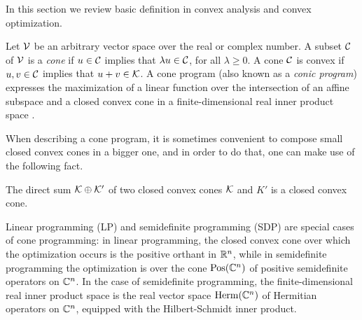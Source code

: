 In this section we review basic definition in convex analysis and convex optimization.

Let $\mathcal{V}$ be an arbitrary vector space over the real or complex number.
A subset $\mathcal{C}$ of $\mathcal{V}$ is a \emph{cone} if $u\in\mathcal{C}$ implies that $\lambda u \in \mathcal{C}$,
for all $\lambda \geq 0$. A cone $\mathcal{C}$ is convex if $u,v\in\mathcal{C}$ implies that
$u + v \in \mathcal{K}$.
A cone program (also known as a \emph{conic program}) expresses the
maximization of a linear function over the intersection of an affine subspace
and a closed convex cone in a finite-dimensional real inner product
space \cite{Boyd04}. 

When describing a cone program, it is sometimes convenient to compose small closed convex 
cones in a bigger one, and in order to do that, one can make use of the following fact. 
\begin{fact}
\label{fact:direct-sum-closed}
The direct sum $\mathcal{K} \oplus \mathcal{K}'$ of two closed convex cones $\mathcal{K}$ and $K'$ is a 
closed convex cone. 
\end{fact}

Linear programming (LP) and semidefinite programming (SDP) are special cases of cone
programming: in linear programming, the closed convex cone over which the
optimization occurs is the positive orthant in $\mathbb{R}^n$, while in semidefinite
programming the optimization is over the cone $\mathrm{Pos}(\mathbb{C}^n)$ of positive
semidefinite operators on $\mathbb{C}^n$.
In the case of semidefinite programming, the finite-dimensional real inner
product space is the real vector space $\mathrm{Herm}(\mathbb{C}^n)$ of Hermitian
operators on $\mathbb{C}^n$, equipped with the Hilbert-Schmidt inner product.

